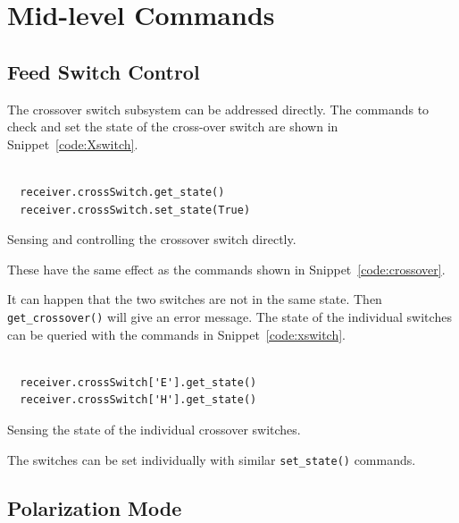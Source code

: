 \documentclass[letterpaper,11pt]{book}
\begin{document}
\section{Mid-level Commands}

\subsection{Feed Switch Control}

The crossover switch subsystem can be addressed directly.
The commands to check and set the state of the cross-over switch are shown in
Snippet~\ref{code:Xswitch}.
\begin{code}[h!tb]
\begin{center}
  \begin{verbatim}

  receiver.crossSwitch.get_state()
  receiver.crossSwitch.set_state(True)\end{verbatim}
  \caption{\label{code:Xswitch}Sensing and controlling the crossover switch
directly.}
\end{center}
\end{code}
These have the same effect as the commands shown in 
Snippet~\ref{code:crossover}.


It can happen that the two switches are not in the same state.  Then
{\tt get\_crossover()} will give an error message.  The state of the individual
switches can be queried with the commands in Snippet~\ref{code:xswitch}.
\begin{code}[h!tb]
\begin{center}
  \begin{verbatim}
  
  receiver.crossSwitch['E'].get_state()
  receiver.crossSwitch['H'].get_state()\end{verbatim}
  \caption{\label{code:xswitch}Sensing the state of the individual crossover
  switches.}
\end{center}
\end{code}
The switches can be set individually with similar {\tt set\_state()} commands.

\subsection{Polarization Mode}
\end{document}
